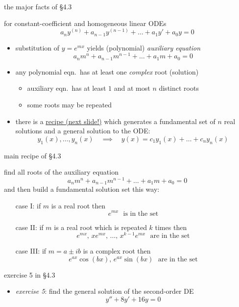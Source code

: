 \documentclass{beamer}
\begin{document}
\begin{frame}{the major facts of \S4.3}

for constant-coefficient and homogeneous linear ODEs
    $$a_n y^{(n)} + a_{n-1} y^{(n-1)} + \dots + a_1 y' + a_0 y = 0$$

\begin{itemize}
\item substitution of $y=e^{mx}$ yields (polynomial) \emph{auxiliary equation}
    $$a_n m^n + a_{n-1} m^{n-1} + \dots + a_1 m + a_0 = 0$$
\item any polynomial eqn.~has at least one \emph{complex} root (solution)
    \begin{itemize}
    \item auxiliary eqn.~has at least $1$ and at most $n$ distinct roots
    \item some roots may be repeated
    \end{itemize}
\item there is a \underline{recipe (next slide!)} which generates a fundamental set of $n$ real solutions and a general solution to the ODE:
    $$y_1(x),\dots,y_n(x) \quad \implies \quad y(x) = c_1 y_1(x) + \dots + c_n y_n(x)$$
\end{itemize}
\end{frame}


\begin{frame}{main recipe of \S4.3}

find all roots of the auxiliary equation
    $$a_n m^n + a_{n-1} m^{n-1} + \dots + a_1 m + a_0 = 0$$
and then build a fundamental solution set this way:
\begin{itemize}
\item[case I:]   if $m$ is a real root then
    $$e^{mx} \,\, \text{ is in the set}$$
\item[case II:]  if $m$ is a real root which is repeated $k$ times then
    $$e^{mx}, \, x e^{mx}, \, \dots, \, x^{k-1} e^{mx} \,\, \text{ are in the set}$$
\item[case III:] if $m=a\pm i b$ is a complex root then
    $$e^{ax} \cos(bx), \, e^{ax} \sin(bx) \,\, \text{ are in the set}$$
\end{itemize}
\end{frame}


\begin{frame}{exercise 5 in \S4.3}

\begin{itemize}
\item \emph{exercise 5}:  find the general solution of the second-order DE
    $$y''+8y'+16y=0$$
\end{itemize}

\vspace{60mm}
\end{frame}
\end{document}
